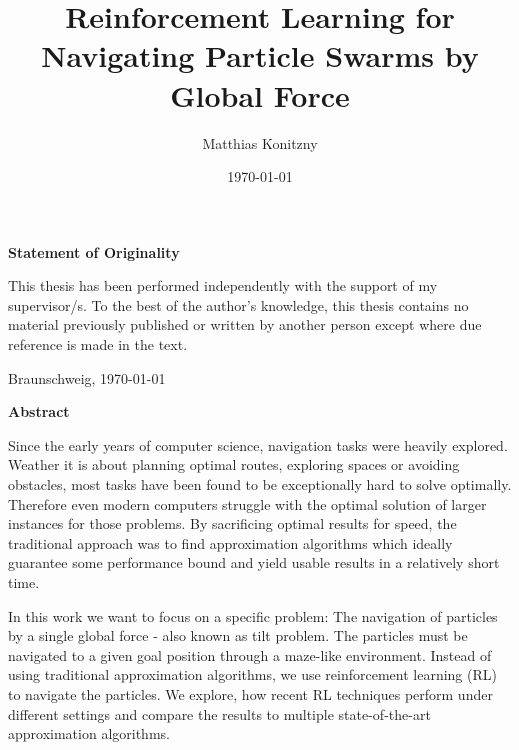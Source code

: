 \documentclass[%
  a4paper,%
  11pt,%
  style=print,
  blue,%
  bibliography=totoc,
  nexus,
  lnum,
  extramargin,
  table
  ]{tubsbook}
\title{Reinforcement Learning for Navigating Particle Swarms by Global Force}
\author{Matthias Konitzny}
\date{\today}
\begin{document}
\maketitle

\frontmatter

\cleardoublepage


\thispagestyle{plain} %
\vspace*{7cm}
\centerline{\bfseries Statement of Originality}
\vspace*{1em}
\noindent
This thesis has been performed independently with the support of my supervisor/s.
To the best of the author's knowledge, this thesis contains no material previously
published or written by another person except where due reference is made in the text.

\par
  \bigskip\noindent Braunschweig, \today \par
  \vspace*{10mm}
  \hfill\hrulefill
\cleardoublepage

\thispagestyle{plain} %
\centerline{\bfseries Abstract}
\vspace*{1em}
\noindent
Since the early years of computer science, navigation tasks were heavily explored. Weather it is about planning optimal routes, exploring spaces or avoiding obstacles, most tasks have been found to be exceptionally hard to solve optimally. Therefore even modern computers struggle with the optimal solution of larger instances for those problems. By sacrificing optimal results for speed, the traditional approach was to find approximation algorithms which ideally guarantee some performance bound and yield usable results in a relatively short time. 

In this work we want to focus on a specific problem: The navigation of particles by a single global force - also known as tilt problem. The particles must be navigated to a given goal position through a maze-like environment. Instead of using traditional approximation algorithms, we use reinforcement learning (RL) to navigate the particles. We explore, how recent RL techniques perform under different settings and compare the results to multiple state-of-the-art approximation algorithms.
\cleardoublepage

\tableofcontents
\cleardoublepage

\listoffigures
\cleardoublepage
\end{document}

